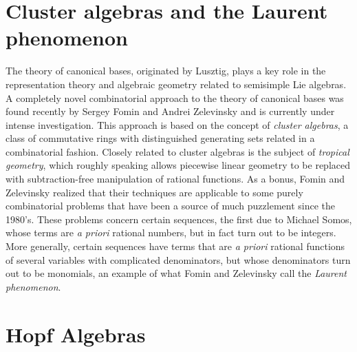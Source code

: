 \documentclass{amsart}
\begin{document}
\section{Cluster algebras and the Laurent phenomenon} 
The theory of canonical bases, originated by Lusztig, plays a key role
in the representation theory and algebraic geometry related to
semisimple Lie algebras.  A completely novel combinatorial approach to
the theory of canonical bases was found recently by Sergey Fomin and
Andrei Zelevinsky and is currently under intense investigation. This
approach is based on the concept of \emph{cluster algebras}, a class
of commutative rings with distinguished generating sets related in a
combinatorial fashion. Closely related to cluster algebras is the
subject of \emph{tropical geometry}, which roughly speaking allows
piecewise linear geometry to be replaced with subtraction-free
manipulation of rational functions.  As a bonus, Fomin and Zelevinsky
realized that their techniques are applicable to some purely
combinatorial problems that have been a source of much puzzlement
since the 1980's. These problems concern certain sequences, the first
due to Michael Somos, whose terms are \emph{a priori} rational
numbers, but in fact turn out to be integers.  More generally, certain
sequences have terms that are \emph{a priori} rational functions of
several variables with complicated denominators, but whose
denominators turn out to be monomials, an example of what Fomin and
Zelevinsky call the \emph{Laurent phenomenon}.


\section{Hopf Algebras}
\end{document}
